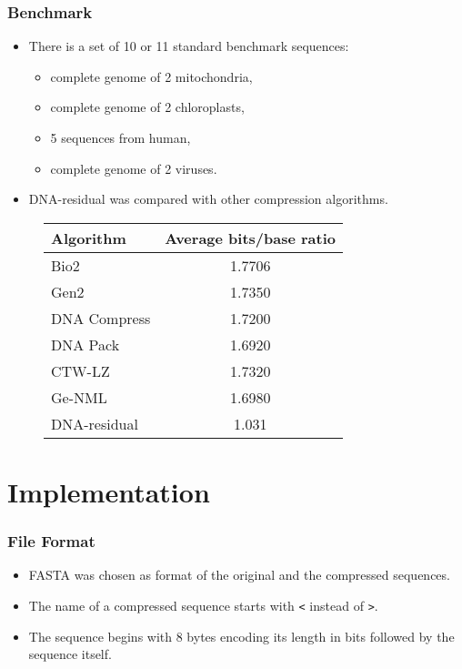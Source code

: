 \documentclass[hyperref={colorlinks=true}]{beamer}
\begin{document}
\begin{frame}
\frametitle{Benchmark}

\begin{itemize}
	\item There is a set of 10 or 11 standard benchmark sequences:
		\begin{itemize}
			\item complete genome of 2 mitochondria,
			\item complete genome of 2 chloroplasts,
			\item 5 sequences from human,
			\item complete genome of 2 viruses.
		\end{itemize}
	\item DNA-residual was compared with other compression algorithms.
\end{itemize}

\begin{figure}
\centering
\begin{tabular}{|l||c|}
\hline
Algorithm & Average bits/base ratio \\ \hline
\hline
Bio2 & 1.7706 \\ \hline
Gen2 & 1.7350 \\ \hline
DNA Compress & 1.7200 \\ \hline
DNA Pack & 1.6920 \\ \hline
CTW-LZ & 1.7320 \\ \hline
Ge-NML & 1.6980 \\ \hline
\hline
DNA-residual & 1.031 \\ \hline
\end{tabular}
\end{figure}

\end{frame}

\section{Implementation}

\begin{frame}[fragile]
\frametitle{File Format}

\begin{itemize}
	\item FASTA was chosen as format of the original and the compressed sequences.
	\item The name of a compressed sequence starts with \verb|<| instead of \verb|>|.
	\item The sequence begins with 8 bytes encoding its length in bits followed by the sequence itself.
\end{itemize}

\end{frame}
\end{document}
